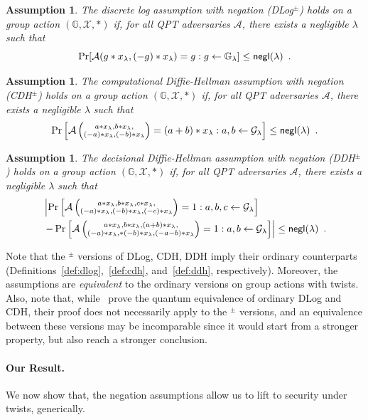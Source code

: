 \documentclass{article}\usepackage[a4paper,margin=20mm]{geometry}
\newtheorem{assumption}[theorem]{Assumption}
\numberwithin{theorem}{section}
\numberwithin{equation}{section}
\newcommand{\G}{\mathbb{G}}
\newcommand{\As}{{\mathcal{A}}}
\newcommand{\Gs}{{\mathcal{G}}}
\newcommand{\Xs}{{\mathcal{X}}}
\newcommand{\negl}{{\sf negl}}
\begin{document}
\begin{assumption}\label{def:dlogpm} The \emph{discrete log assumption with negation} (DLog$^\pm$) holds on a group action $(\G,\Xs,*)$ if, for all QPT adversaries $\As$, there exists a negligible $\lambda$ such that 
	\[\Pr[\As(g*x_\lambda,(-g)*x_\lambda)=g:g\gets\G_\lambda]\leq\negl(\lambda)\enspace .\]
\end{assumption}
\begin{assumption}\label{def:cdhpm} The \emph{computational Diffie-Hellman assumption with negation} (CDH$^\pm$) holds on a group action $(\G,\Xs,*)$ if, for all QPT adversaries $\As$, there exists a negligible $\lambda$ such that 
	\[\Pr\left[\As\left(\substack{a*x_\lambda,b*x_\lambda,\\(-a)*x_\lambda,(-b)*x_\lambda}\right)=(a+b)*x_\lambda: a,b\gets\Gs_\lambda\right]\leq\negl(\lambda)\enspace .\]
\end{assumption}
\begin{assumption}\label{def:ddhpm} The \emph{decisional Diffie-Hellman assumption with negation} (DDH$^\pm$) holds on a group action $(\G,\Xs,*)$ if, for all QPT adversaries $\As$, there exists a negligible $\lambda$ such that 
	\begin{align*}&\left|\Pr\left[\As\left(\substack{a*x_\lambda,b*x_\lambda,c*x_\lambda,\\(-a)*x_\lambda,(-b)*x_\lambda,(-c)*x_\lambda}\right)=1: a,b,c\gets\Gs_\lambda\right]\right.\\&\left.-\Pr\left[\As\left(\substack{a*x_\lambda,b*x_\lambda,(a+b)*x_\lambda,\\(-a)*x_\lambda,*(-b)*x_\lambda,(-a-b)*x_\lambda}\right)=1:a,b\gets\Gs_\lambda\right]\right|\leq\negl(\lambda)\enspace .\end{align*}
\end{assumption}

Note that the $^\pm$ versions of DLog, CDH, DDH imply their ordinary counterparts (Definitions~\ref{def:dlog},~\ref{def:cdh}, and~\ref{def:ddh}, respectively). Moreover, the assumptions are \emph{equivalent} to the ordinary versions on group actions with twists. Also, note that, while~\cite{DBLP:journals/joc/MontgomeryZ24} prove the quantum equivalence of ordinary DLog and CDH, their proof does not necessarily apply to the $^\pm$ versions, and an equivalence between these versions may be incomparable since it would start from a stronger property, but also reach a stronger conclusion.

\paragraph{Our Result.} We now show that, the negation assumptions allow us to lift to security under twists, generically.
\end{document}
